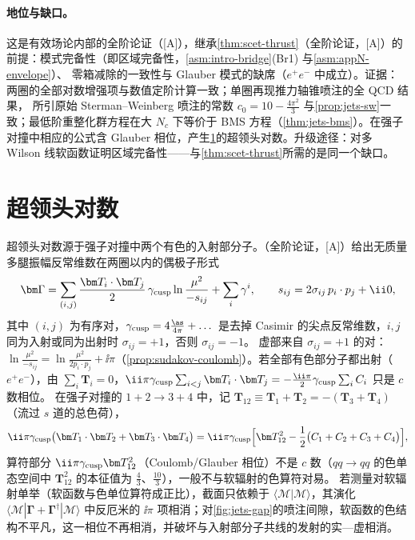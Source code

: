\paragraph{地位与缺口。}
这是有效场论内部的全阶论证（[A]），继承\cref{thm:scet-thrust}（全阶论证，[A]）的前提：模式完备性（即区域完备性，\cref{asm:intro-bridge}(Br1) 与\cref{asm:appN-envelope}）、
零箱减除的一致性与 Glauber 模式的缺席（$e^+e^-$ 中成立）。证据：两圈的全部对数增强项与数值定阶计算一致\cite{Becher:2016mmh}；单圈再现推力轴锥喷注的全 QCD 结果，
所引原始 Sterman--Weinberg 喷注的常数 $c_0=10-\frac{4\pi^2}{3}$ 与\cref{prop:jets-sw}一致\cite[式~(1)]{Becher:2015hka}；最低阶重整化群方程在大 $N_c$ 下等价于 BMS 方程（\cref{thm:jets-bms}）\cite[第~5~节]{Becher:2016mmh}。在强子对撞中相应的公式含 Glauber 相位，产生\cref{sec:jets-sll}的超领头对数。升级途径：对多 Wilson 线软函数证明区域完备性——与\cref{thm:scet-thrust}所需的是同一个缺口。
\section{超领头对数}\label{sec:jets-sll}

超领头对数源于强子对撞中两个有色的入射部分子。（全阶论证，[A]）给出无质量多腿振幅反常维数在两圈以内的偶极子形式
\begin{equation}\label{eq:jets-dipole}
\bm\Gamma=\sum_{(i,j)}\frac{\bm T_i\cdot\bm T_j}{2}\,\gamma_{\rm cusp}\ln\frac{\mu^2}{-s_{ij}}+\sum_i\gamma^i,\qquad s_{ij}=2\sigma_{ij}\,p_i\cdot p_j+\ii0 ,
\end{equation}
其中 $(i,j)$ 为有序对，$\gamma_{\rm cusp}=4\frac{\as}{4\pi}+\dots$ 是去掉 Casimir 的尖点反常维数，$i,j$ 同为入射或同为出射时 $\sigma_{ij}=+1$，否则 $\sigma_{ij}=-1$。
虚部来自 $\sigma_{ij}=+1$ 的对：$\ln\frac{\mu^2}{-s_{ij}}=\ln\frac{\mu^2}{2p_i\cdot p_j}+\ii\pi$（\cref{prop:sudakov-coulomb}）。若全部有色部分子都出射（$e^+e^-$），由 $\sum_i\bm T_i=0$，$\ii\pi\gamma_{\rm cusp}\sum_{i<j}\bm T_i\cdot\bm T_j=-\frac{\ii\pi}{2}\gamma_{\rm cusp}\sum_iC_i$ 只是 $c$ 数相位。
在强子对撞的 $1+2\to3+4$ 中，记 $\bm T_{12}\equiv\bm T_1+\bm T_2=-(\bm T_3+\bm T_4)$（流过 $s$ 道的总色荷），
\begin{equation}\label{eq:jets-coulomb-pp}
\ii\pi\gamma_{\rm cusp}\big(\bm T_1\cdot\bm T_2+\bm T_3\cdot\bm T_4\big)=\ii\pi\gamma_{\rm cusp}\Big[\bm T_{12}^2-\frac12\big(C_1+C_2+C_3+C_4\big)\Big],
\end{equation}
算符部分 $\ii\pi\gamma_{\rm cusp}\bm T_{12}^2$（Coulomb/Glauber 相位）不是 $c$ 数（$qq\to qq$ 的色单态空间中 $\bm T_{12}^2$ 的本征值为 $\frac43$、$\frac{10}{3}$），一般不与软辐射的色算符对易。
若测量对软辐射单举（软函数与色单位算符成正比），截面只依赖于 $\langle\mathcal M|\mathcal M\rangle$，其演化 $\langle\mathcal M|\bm\Gamma+\bm\Gamma^\dagger|\mathcal M\rangle$ 中反厄米的 $\ii\pi$ 项相消；对\cref{fig:jets-gap}的喷注间隙，软函数的色结构不平凡，这一相位不再相消，并破坏与入射部分子共线的发射的实—虚相消。

